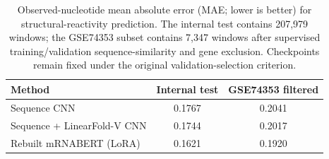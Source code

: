 \begin{table}[t]
\centering
\caption{Observed-nucleotide mean absolute error (MAE; lower is better) for structural-reactivity prediction. The internal test contains 207,979 windows; the GSE74353 subset contains 7,347 windows after supervised training/validation sequence-similarity and gene exclusion. Checkpoints remain fixed under the original validation-selection criterion.}
\label{tab:reactivity_mae}
\begin{tabular}{lcc}
\hline
Method & Internal test & GSE74353 filtered \\
\hline
Sequence CNN & 0.1767 & 0.2041 \\
Sequence + LinearFold-V CNN & 0.1744 & 0.2017 \\
Rebuilt mRNABERT (LoRA) & 0.1621 & 0.1920 \\
\hline
\end{tabular}
\end{table}
